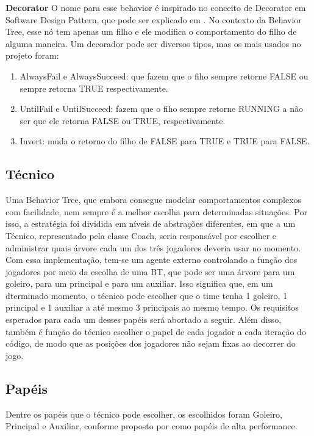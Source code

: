 \documentclass[a4paper,12pt]{article}
\begin{document}
\textbf{Decorator} O nome para esse behavior é inspirado no conceito de Decorator em Software Design Pattern, que pode ser explicado em \cite{hunt2013gang}. No contexto da Behavior Tree, esse nó tem apenas um filho e ele modifica o comportamento do filho de alguma maneira. Um decorador pode ser diversos tipos, mas os mais usados no projeto foram:

\begin{enumerate}
\item AlwaysFail e AlwaysSucceed: que fazem que o fiho sempre retorne FALSE ou sempre retorna TRUE respectivamente.
\item UntilFail e UntilSucceed: fazem que o fiho sempre retorne RUNNING a não ser que ele retorna FALSE ou TRUE, respectivamente.
\item Invert: muda o retorno do filho de FALSE para TRUE e TRUE para FALSE.
\end{enumerate}

\subsection{Técnico}

Uma Behavior Tree, que embora consegue modelar comportamentos complexos com facilidade, nem sempre é a melhor escolha para determinadas situações. Por isso, a estratégia foi dividida em níveis de abstrações diferentes, em que a um Técnico, representado pela classe Coach, seria responsável por escolher e administrar quais árvore cada um dos três jogadores deveria usar no momento.
Com essa implementação, tem-se um agente externo controlando a função dos jogadores por meio da escolha de uma BT, que pode ser uma árvore para um goleiro, para um principal e para um auxiliar. Isso significa que, em um dterminado momento, o técnico pode escolher que o time tenha 1 goleiro, 1 principal e 1 auxiliar a até mesmo 3 principais ao mesmo tempo. Os requisitos esperados para cada um desses papéis será abortado a seguir. Além disso, também é função do técnico escolher o papel de cada jogador a cada iteração do código, de modo que as posições dos jogadores não sejam fixas ao decorrer do jogo.

\subsection{Papéis}

Dentre os papéis que o técnico pode escolher, os escolhidos foram Goleiro, Principal e Auxiliar, conforme  proposto por \cite{egly2005decision} como papéis de alta performance.
\end{document}
